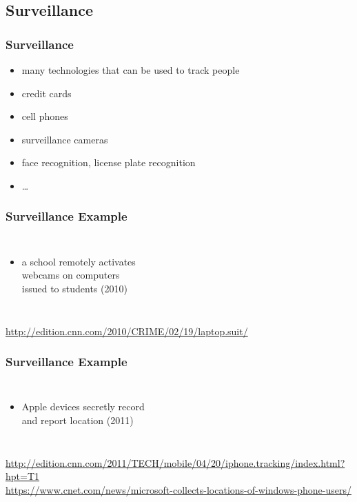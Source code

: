 \documentclass[dvipsnames]{beamer}
\theoremstyle{plain}
\begin{document}
\subsection{Surveillance}

\begin{frame}
  \frametitle{Surveillance}

  \begin{itemize}
    \item many technologies that can be used to track people

    \medskip
    \item credit cards
    \item cell phones
    \item surveillance cameras
    \item face recognition, license plate recognition
    \item \ldots
  \end{itemize}
\end{frame}

\begin{frame}
  \frametitle{Surveillance Example}

  \begin{columns}

    \begin{itemize}
      \item a school remotely activates\\
        webcams on computers\\
        issued to students (2010)
    \end{itemize}
  \end{columns}

  \medskip
  \tiny{\url{http://edition.cnn.com/2010/CRIME/02/19/laptop.suit/}}\\
\end{frame}

\begin{frame}
  \frametitle{Surveillance Example}

  \begin{columns}

    \begin{itemize}
      \item Apple devices secretly record\\
        and report location (2011)
    \end{itemize}
  \end{columns}

  \medskip
  \tiny{\url{http://edition.cnn.com/2011/TECH/mobile/04/20/iphone.tracking/index.html?hpt=T1}}\\
  \tiny{\url{https://www.cnet.com/news/microsoft-collects-locations-of-windows-phone-users/}}\\
\end{frame}
\end{document}
